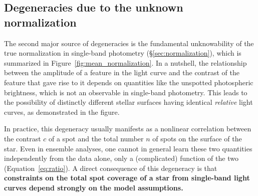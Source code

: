 \documentclass[modern]{aastex62}
\begin{document}
\subsection{Degeneracies due to the unknown normalization}

The second major source of degeneracies is the fundamental
unknowability of the true normalization in single-band
photometry (\S\ref{sec:normalization}), which is summarized in
Figure~\ref{fig:mean_normalization}. In a nutshell, the relationship
between the amplitude of a feature in the light curve and the contrast
of the feature that gave rise to it depends on quantities like the
unspotted photospheric brightness, which is not an observable in
single-band photometry. This leads to the possibility of distinctly
different stellar surfaces having identical \emph{relative}
light curves, as demonstrated in the figure.

In practice, this degeneracy usually manifests as a nonlinear correlation
between the contrast $c$ of a spot and the total number $n$
of spots on the surface of the star. Even in ensemble analyses,
one cannot in general learn these two quantities independently from
the data alone,
only a (complicated) function of the two (Equation~\ref{eq:ratio}).
%
A direct consequence of this degeneracy is that \textbf{constraints on
    the total spot coverage of a star from single-band light curves
    depend strongly on the model assumptions.}
\end{document}
